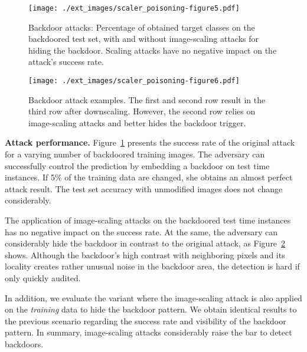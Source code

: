 \documentclass[conference]{IEEEtran}
\renewcommand{\paragraph}[1]{{\vskip 8pt \noindent\bf #1 }}
\begin{document}
\begin{figure}
	\centering
	\texttt{[image: ./ext\_images/scaler\_poisoning-figure5.pdf]}
	\vspace{-0.30cm}
	\caption{Backdoor attacks: 
		Percentage of obtained target classes on the 
		backdoored test 
		set, with and without image-scaling attacks for hiding the 
		backdoor. Scaling attacks have no negative impact on the 
		attack's success rate.
}
	\label{fig:eval_backdoor_plain_testtime}
\end{figure}
\begin{figure}
	\centering
	\texttt{[image: ./ext\_images/scaler\_poisoning-figure6.pdf]}
	\vspace{-0.15cm}
	\caption{Backdoor attack examples.
The first and second row result in the third row after downscaling.
However, the second row relies on image-scaling
attacks and better hides the backdoor trigger.
}
	\label{fig:eval_backdoor_plain_testtime_examples}
\end{figure}

\paragraph{Attack performance.}
Figure~\ref{fig:eval_backdoor_plain_testtime} 
presents the success rate of the original attack for a varying number 
of backdoored training images. The adversary can successfully control 
the prediction by embedding a backdoor on test time instances. If 
5\% of the training data are changed, she obtains an almost perfect 
attack result. The test set accuracy with unmodified images does not 
change considerably.

The application of image-scaling attacks on the backdoored test time 
instances has no negative impact on the success rate.
At the same, the adversary can considerably hide the backdoor in 
contrast to the original attack, as 
Figure~\ref{fig:eval_backdoor_plain_testtime_examples} shows.
Although the backdoor's high contrast with neighboring pixels and its 
locality creates rather unusual noise in the backdoor area, the 
detection is hard if only quickly audited.

In addition, we evaluate the variant where the image-scaling attack is 
also applied on the \emph{training} data to hide the backdoor pattern. 
We obtain identical results to the previous scenario regarding the 
success rate and visibility of the backdoor pattern. 
In summary, image-scaling attacks considerably raise the bar 
to detect backdoors.
\end{document}
